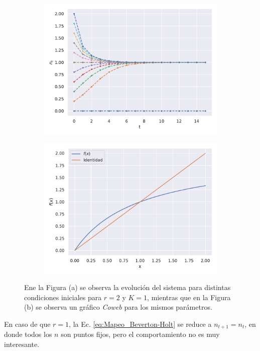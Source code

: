 \begin{figure}[hbt!]
    \centering
    \begin{subfigure}[b]{0.49\textwidth}
        \includegraphics[width=\textwidth, height=0.8\textwidth]{Mapeo_r=2.pdf}
        \caption{}
        \label{01_Simulacion}
    \end{subfigure}
    \hfill
    \begin{subfigure}[b]{0.49\textwidth}
        \includegraphics[width=\textwidth, height=0.8\textwidth]{Coweb_r=2.pdf}
        \caption{}
        \label{01_Coweb}
    \end{subfigure}
    \caption{Ene  la Figura (a) se observa la evolución del sistema para distintas condiciones iniciales para $r=2$ y $K=1$, mientras que en la Figura (b) se observa un gráfico \textit{Coweb} para los mismos parámetros.}
    \label{PONER_LABEL}
\end{figure}


En caso de que $r=1$, la Ec. \ref{eq:Mapeo_Beverton-Holt} se reduce a $n_{t+1} = n_t$, en donde todos los $n$ son puntos fijos, pero el comportamiento no es muy interesante.